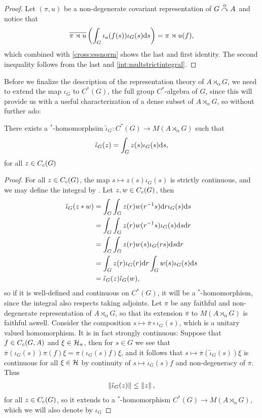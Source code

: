 \begin{proof}
	Let $(\pi, u)$ be a non-degenerate covariant representation of $G \stackrel{\alpha}{\curvearrowright} A$ and notice that
	\begin{align*}
		\overline{\pi \rtimes u}\left( \int_G \iota_a(f(s)) \iota_G(s) \mathrm{d} s  \right) = \pi \rtimes u (f),
	\end{align*}
	which combined with \cref{cross:essnorm} shows the last and first identity. The second inequality follows from the last and  \cref{int:multstrictintegral}.
\end{proof}
Before we finalize the description of the representation theory of $A \rtimes_\alpha G$, we need to extend the map $\iota_G$ to $C^*(G)$, the full group $C^*$-algebra of $G$, since this will provide us with a useful characterization of a dense subset of $A \rtimes_\alpha G$, so without further ado:
\begin{lemma}
	There exists a $^*$-homomorphsim $\tilde \iota_G \colon C^*(G) \to M(A \rtimes_\alpha G)$ such that
	\begin{align*}
		\tilde \iota_G(z) = \int_G z(s) \iota_G(s) \mathrm{d} s, 
	\end{align*}
	for all $z \in C_c(G)$
	\label{cross:2.35}
\end{lemma}
\begin{proof}
	For all $z \in C_c(G)$, the map $s \mapsto z(s) \iota_G(s)$ is strictly continuous, and we may define the integral by . Let $z,w \in C_c(G)$, then
	\begin{align*}
		\tilde \iota_G(z \ast w) &= \int_G \int_G z(r)w(r^{-1}s) \mathrm{d} r \iota_G(s) \mathrm{d} s \\
		&= \int_G \int_G z(r) w(r^{-1}s) \iota_G(s) \mathrm{d} s \mathrm{d} r\\
		&= \int_G \int_G z(r) w(s) \iota_G(rs) \mathrm{d} s \mathrm{d} r\\
		&= \int_G z(r) \iota_G(r) \mathrm{d} r \int_G w(s) \iota_G(s) \mathrm{d} s \\
		&= \tilde \iota_G(z) \tilde \iota_G(w),
	\end{align*}
	so if it is well-defined and continuous on $C^*(G)$, it will be a $^*$-homomorphism, since the integral also respects taking adjoints. Let $\pi$ be any faithful and non-degenerate representation of $A \rtimes_\alpha G$, so that its extension $\overline \pi $ to $M(A \rtimes_ \alpha G)$ is faithful aswell. Consider the composition $s \mapsto \overline{\pi} \circ \iota_G(s)$, which is a unitary valued homomorphism. It is in fact strongly continuous: Suppose that $f \in C_c(G,A)$ and $\xi \in \mathcal{H}_\pi$, then for $s \in G$ we see that $\overline{ \pi} (\iota_G(s)) \pi(f) \xi = \pi(\iota_G(s) f) \xi$, and it follows that $s \mapsto \overline{\pi}(\tilde \iota_G(s)) \xi$ is continuous for all $\xi \in \mathcal{H}$ by continuity of $s \mapsto \iota_G(s)f$ and non-degeneracy of $\pi$. Thus
	\begin{align}
		\left\lVert \tilde \iota_G(z)\right\rVert \leq \left\lVert z \right\rVert,
	\end{align}
	for all $z \in C_c(G)$, so it extends to a $^*$-homomorphism $C^*(G) \to M(A \rtimes_\alpha G)$, which we will also denote by $\iota_G$
\end{proof}
